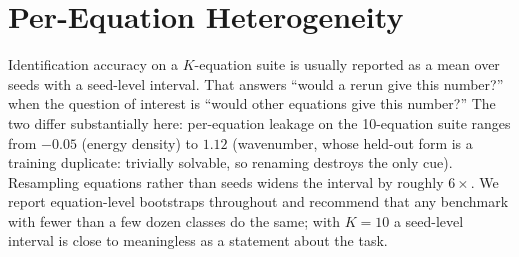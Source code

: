 \section{Per-Equation Heterogeneity}
\label{app:units}

Identification accuracy on a $K$-equation suite is usually reported as a mean over seeds with a
seed-level interval. That answers ``would a rerun give this number?'' when the question of interest
is ``would other equations give this number?'' The two differ substantially here: per-equation
leakage on the 10-equation suite ranges from $-0.05$ (energy density) to $1.12$ (wavenumber, whose
held-out form is a training duplicate: trivially solvable, so renaming destroys the only cue).
Resampling equations rather than seeds widens the interval by roughly $6\times$. We report
equation-level bootstraps throughout and recommend that any benchmark with fewer than a few dozen
classes do the same; with $K{=}10$ a seed-level interval is close to meaningless as a statement
about the task.
